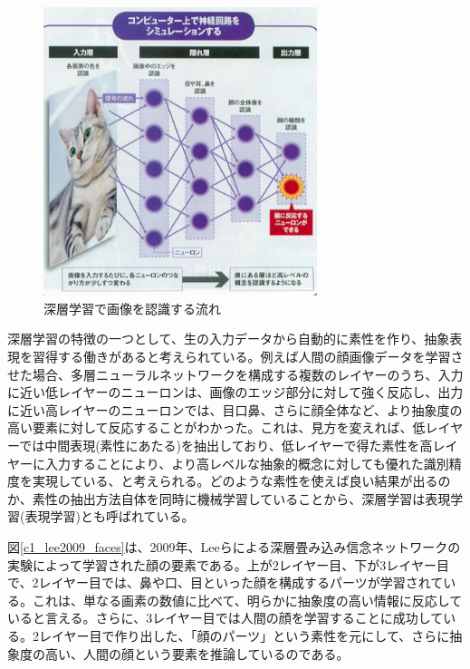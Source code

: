 \begin{figure}[tbp]
 \begin{center}
  \includegraphics[width=80mm]{img/c1/nikkei}
 \end{center}
 \caption{深層学習で画像を認識する流れ}
 \label{c1_nikkei}
\end{figure}
深層学習の特徴の一つとして、生の入力データから自動的に素性を作り、抽象表現を習得する働きがあると考えられている。例えば人間の顔画像データを学習させた場合、多層ニューラルネットワークを構成する複数のレイヤーのうち、入力に近い低レイヤーのニューロンは、画像のエッジ部分に対して強く反応し、出力に近い高レイヤーのニューロンでは、目口鼻、さらに顔全体など、より抽象度の高い要素に対して反応することがわかった。これは、見方を変えれば、低レイヤーでは中間表現(素性にあたる)を抽出しており、低レイヤーで得た素性を高レイヤーに入力することにより、より高レベルな抽象的概念に対しても優れた識別精度を実現している、と考えられる。どのような素性を使えば良い結果が出るのか、素性の抽出方法自体を同時に機械学習していることから、深層学習は表現学習(表現学習)とも呼ばれている。\par
図\ref{c1_lee2009_faces}は、2009年、Leeらによる深層畳み込み信念ネットワークの実験によって学習された顔の要素である。上が2レイヤー目、下が3レイヤー目で、2レイヤー目では、鼻や口、目といった顔を構成するパーツが学習されている。これは、単なる画素の数値に比べて、明らかに抽象度の高い情報に反応していると言える。さらに、3レイヤー目では人間の顔を学習することに成功している。2レイヤー目で作り出した、「顔のパーツ」という素性を元にして、さらに抽象度の高い、人間の顔という要素を推論しているのである。\cite{lee2009convolutional}

